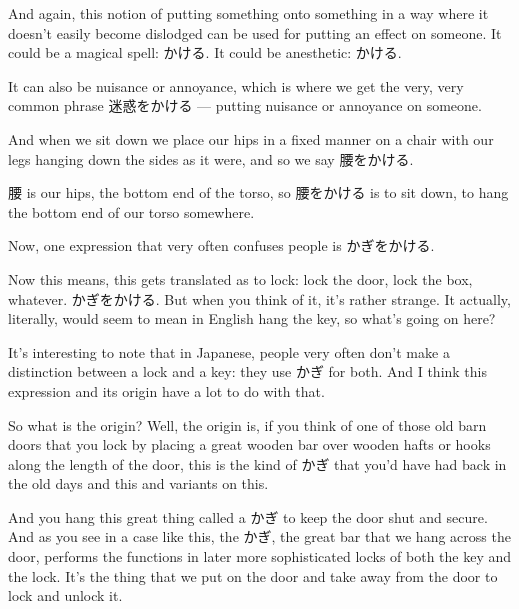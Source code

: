 {}

And again, this notion of putting something onto something in a way where it doesn't easily become dislodged can be used for putting an effect on someone. It could be a magical spell: かける. It could be anesthetic: かける.

{}

It can also be nuisance or annoyance, which is where we get the very, very common phrase 迷惑をかける --- putting nuisance or annoyance on someone.

And when we sit down we place our hips in a fixed manner on a chair with our legs hanging down the sides as it were, and so we say 腰をかける.

{}

腰 is our hips, the bottom end of the torso, so 腰をかける is to sit down, to hang the bottom end of our torso somewhere.

\thinrule

Now, one expression that very often confuses people is かぎをかける.

{}

Now this means, this gets translated as to lock: lock the door, lock the box, whatever. かぎをかける. But when you think of it, it's rather strange. It actually, literally, would seem to mean in English hang the key, so what's going on here?

It's interesting to note that in Japanese, people very often don't make a distinction between a lock and a key: they use かぎ for both. And I think this expression and its origin have a lot to do with that.

So what is the origin? Well, the origin is, if you think of one of those old barn doors that you lock by placing a great wooden bar over wooden hafts or hooks along the length of the door, this is the kind of かぎ that you'd have had back in the old days and this and variants on this.

{}

And you hang this great thing called a かぎ to keep the door shut and secure. And as you see in a case like this, the かぎ, the great bar that we hang across the door, performs the functions in later more sophisticated locks of both the key and the lock. It's the thing that we put on the door and take away from the door to lock and unlock it.

